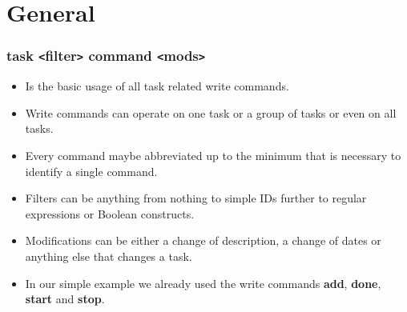 \documentclass[t,handout]{beamer}
\begin{document}
\section{General}


\begin{frame}
\frametitle{task {\tt<}filter{\tt>} command {\tt<}mods{\tt>}}
\pause
\begin{itemize} 
\item Is the basic usage of all task related write commands. \pause
\item Write commands can operate on one task or a group of tasks or even on all tasks. \pause
\item Every command maybe abbreviated up to the minimum that is necessary to identify a single command. \pause
\item Filters can be anything from nothing to simple IDs further to regular expressions or Boolean constructs. \pause
\item Modifications can be either a change of description, a change of dates or anything else that changes a task. \pause
\item In our simple example we already used the write commands \textbf{add}, \textbf{done}, \textbf{start} and \textbf{stop}.
\end{itemize}
\end{frame}
\end{document}
